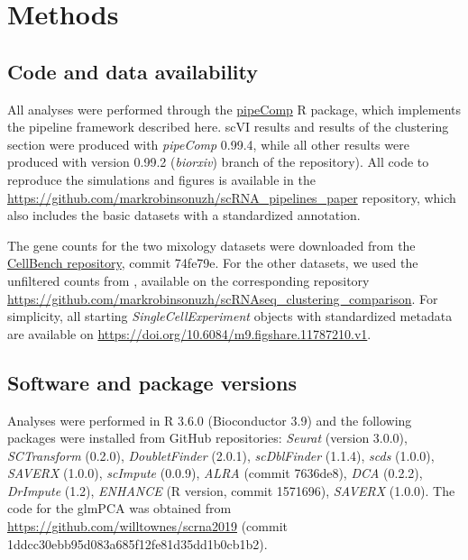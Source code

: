 \documentclass{bmcart}
\begin{document}
\section*{Methods}

\subsection*{Code and data availability}

All analyses were performed through the \href{https://github.com/plger/pipeComp}{pipeComp} R package, which implements the pipeline framework described here. scVI results and results of the clustering section were produced with \textit{pipeComp} 0.99.4, while all other results were produced with version 0.99.2 (\textit{biorxiv}) branch of the repository). All code to reproduce the simulations and figures is available in the \url{https://github.com/markrobinsonuzh/scRNA\_pipelines\_paper} repository, which also includes the basic datasets with a standardized annotation.

The gene counts for the two mixology datasets were downloaded from the  \href{https://github.com/LuyiTian/CellBench_data/data/sincell_with_class.RData}{CellBench repository}, commit 74fe79e. For the other datasets, we used the unfiltered counts from \cite{duoClustering2018}, available on the corresponding repository \url{https://github.com/markrobinsonuzh/scRNAseq\_clustering\_comparison}. For simplicity, all starting \textit{SingleCellExperiment} objects with standardized metadata are available on \url{https://doi.org/10.6084/m9.figshare.11787210.v1}.

\subsection*{Software and package versions}
Analyses were performed in R 3.6.0 (Bioconductor 3.9) and the following packages were installed from GitHub repositories: \textit{Seurat} (version 3.0.0), \textit{SCTransform} (0.2.0), \textit{DoubletFinder} (2.0.1), \textit{scDblFinder} (1.1.4), \textit{scds} (1.0.0), \textit{SAVERX} (1.0.0), \textit{scImpute} (0.0.9), \textit{ALRA} (commit 7636de8), \textit{DCA} (0.2.2), \textit{DrImpute} (1.2), \textit{ENHANCE} (R version, commit 1571696), \textit{SAVERX} (1.0.0). The code for the glmPCA was obtained from \url{https://github.com/willtownes/scrna2019} (commit 1ddcc30ebb95d083a685f12fe81d35dd1b0cb1b2).
\end{document}
